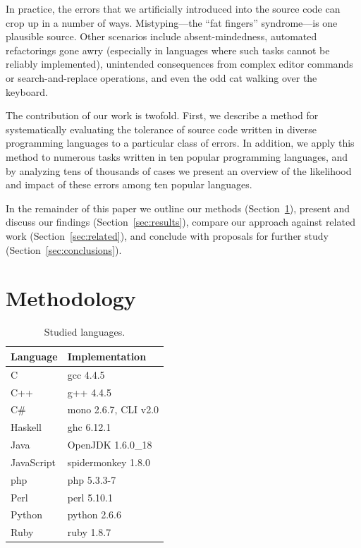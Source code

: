 \documentclass[10pt]{sigplanconf}
\begin{document}
In practice,
the errors that we artificially introduced into the source code can
crop up in a number of ways.
Mistyping---the ``fat fingers'' syndrome---is one plausible source.
Other scenarios include
absent-mindedness,
automated refactorings \cite{Fow00} gone awry
(especially in languages where such tasks cannot be reliably implemented),
unintended consequences from complex editor commands or
search-and-replace operations,
and even the odd cat walking over the keyboard.

The contribution of our work is twofold.
First, we describe a method for systematically evaluating the tolerance
of source code written in diverse programming languages to a particular
class of errors.
In addition, we apply this method to numerous tasks written in ten popular
programming languages,
and by analyzing tens of thousands of cases we present an overview of
the likelihood and impact of these errors among ten popular languages.

In the remainder of this paper we
outline our methods (Section~\ref{sec:method}),
present and discuss our findings (Section~\ref{sec:results}),
compare our approach against related work (Section~\ref{sec:related}),
and conclude with proposals for further study (Section~\ref{sec:conclusions}).

\section{Methodology} %
\label{sec:method}

\begin{table}
\begin{center}
\begin{tabular}{ l l}
Language & Implementation \\
\hline
C 			& gcc 4.4.5 \\
C++ 		& g++ 4.4.5 \\
C\# 		& mono 2.6.7, CLI v2.0 \\
Haskell 	& ghc 6.12.1 \\
Java 		& OpenJDK 1.6.0\_18 \\
JavaScript 	& spidermonkey 1.8.0 \\
{\sc php} 		& {\sc php} 5.3.3-7 \\
Perl 		& perl 5.10.1 \\
Python 		& python 2.6.6 \\
Ruby 		& ruby 1.8.7 \\
\end{tabular}
\end{center}
\caption{Studied languages.}
\label{tab:langs}
\end{table}
\end{document}
